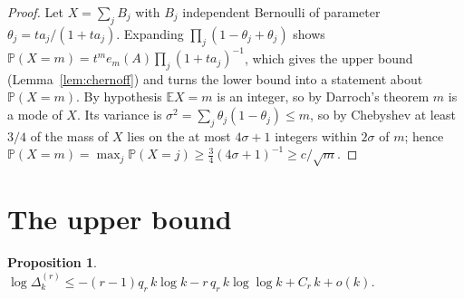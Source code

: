 \documentclass[11pt,reqno]{amsart}
\theoremstyle{plain}
\newtheorem{proposition}[theorem]{Proposition}
\theoremstyle{definition}
\numberwithin{equation}{section}
\begin{document}
\begin{proof}
Let $X=\sum_jB_j$ with $B_j$ independent Bernoulli of parameter
$\theta_j=ta_j/(1+ta_j)$. Expanding $\prod_j(1-\theta_j+\theta_j)$ shows
$\mathbb P(X=m)=t^{m}e_m(A)\prod_j(1+ta_j)^{-1}$, which gives the upper bound
(Lemma~\ref{lem:chernoff}) and turns the lower bound into a statement about
$\mathbb P(X=m)$. By hypothesis $\mathbb E X=m$ is an integer, so by Darroch's theorem $m$
is a mode of $X$. Its variance is $\sigma^{2}=\sum_j\theta_j(1-\theta_j)\le m$, so by
Chebyshev at least $3/4$ of the mass of $X$ lies on the at most $4\sigma+1$ integers within
$2\sigma$ of $m$; hence $\mathbb P(X=m)=\max_j\mathbb P(X=j)\ge\frac34(4\sigma+1)^{-1}\ge
c/\sqrt m$.
\end{proof}

\section{The upper bound}\label{sec:upper}

\begin{proposition}\label{prop:upper}
$\log\Delta^{(r)}_k\le-(r-1)q_r\,k\log k-r\,q_r\,k\log\log k+C_r\,k+o(k)$.
\end{proposition}
\end{document}
